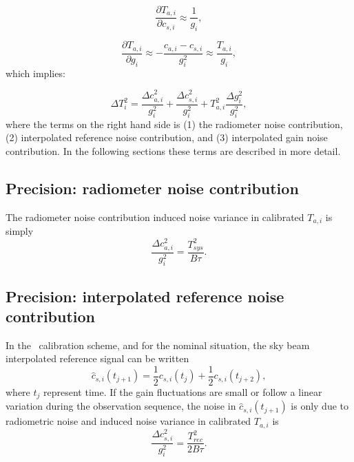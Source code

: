 \begin{equation}
\frac{\partial T_{a,i}}{\partial c_{s,i}} \approx \frac{1}{g_i}, 
\end{equation}

\begin{equation}
\frac{\partial T_{a,i}}{\partial g_{i}} \approx -\frac{c_{a,i}-c_{s,i}}{g_{i}^{2}} \approx \frac{T_{a,i}}{g_i}, 
\end{equation}
which implies:

\begin{equation}
\Delta T_{i}^{2} = \frac{\Delta c_{a,i}^{2}}{g_{i}^2} + \frac{\Delta c_{s,i}^{2}}{g_{i}^2} + T_{a,i}^{2}\frac{\Delta g_{i}^{2}}{g_{i}^2},
\end{equation}
where the terms on the right hand side is (1) the radiometer noise contribution,
(2) interpolated reference noise contribution, and (3) interpolated gain noise contribution.  
In the following sections these terms are described in more detail.

\subsection*{Precision: radiometer noise contribution}
The radiometer noise contribution induced noise variance in calibrated \(T_{a,i}\) is simply
\begin{equation}
\frac{\Delta c_{a,i}^{2}}{g_{i}^2} = \frac{T_{sys}^{2}}{B\tau}.
\end{equation}



\subsection*{Precision: interpolated reference noise contribution}
In the \smr\ calibration scheme, and for the nominal situation, the sky beam interpolated
reference signal can be written
\begin{equation}
\hat{c}_{s,i}(t_{j+1}) = \frac{1}{2}c_{s,i}(t_{j}) + \frac{1}{2}c_{s,i}(t_{j+2}), 
\end{equation}
where \(t_{j}\) represent time.  
If the gain fluctuations are small or follow a linear variation during the
observation sequence, the noise in \(\hat{c}_{s,i}(t_{j+1})\) is only due to radiometric
noise and induced noise variance in calibrated \(T_{a,i}\) is
\begin{equation}
\frac{\Delta c_{s,i}^{2}}{g_{i}^2} = \frac{T_{rec}^{2}}{2B\tau}.
\end{equation}

